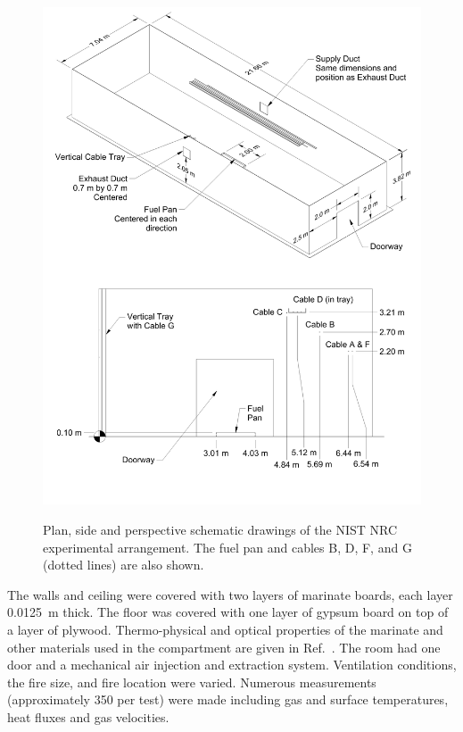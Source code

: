 \begin{figure}[\figoptions{t}]
\begin{center}
\includegraphics[width=6.5in]{FIGURES/NIST_NRC/NIST_NRC_Drawing}\\
\end{center}
\caption{Plan, side and perspective schematic drawings of the NIST NRC experimental arrangement. The fuel pan and cables B, D, F, and G (dotted lines) are also shown.}
 \label{fig:NISTNRC_Detailed}
\end{figure}

The walls and ceiling were covered with two layers of marinate boards, each layer 0.0125~m thick. The floor
was covered with one layer of gypsum board on top of a layer of plywood. Thermo-physical and optical properties of the marinate
and other materials used in the compartment are given in Ref.~\cite{Hamins:2005}. The room had one door and a mechanical air injection and extraction
system. Ventilation conditions, the fire size, and fire location were varied. Numerous measurements (approximately 350 per test) were made including
gas and surface temperatures, heat fluxes and gas velocities.

